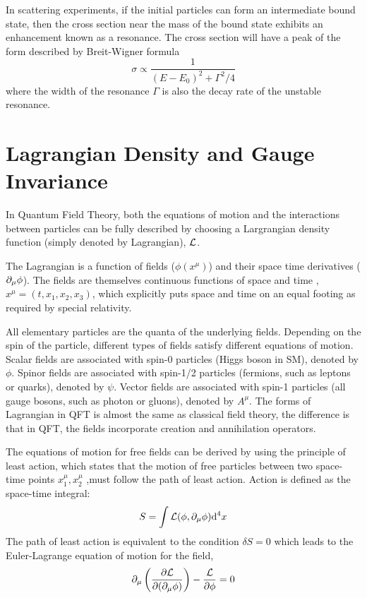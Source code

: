 In scattering experiments, if the initial particles can form an intermediate bound state, then the cross section near the mass of the bound state exhibits an enhancement known as a resonance.  The cross section will have a peak of the form described by Breit-Wigner formula
 \begin{equation}
 \sigma \propto \frac{1}{(E-E_0)^2+\Gamma^2/4}
 \end{equation} 
where the width of the resonance $\Gamma$ is also the decay rate of the unstable resonance.
 
 \section{Lagrangian Density and Gauge Invariance}
 In Quantum Field Theory, both the equations of motion and the interactions between particles can be fully described by choosing a Largrangian density function (simply denoted by Lagrangian), $\mathcal{L}$. 
 
The Lagrangian is a function of fields ($\phi(x^{\mu})$) and their space time derivatives ($\partial_\mu\phi$). The fields are themselves continuous functions of space and time , $x^{\mu} = (t,x_1,x_2,x_3)$, which explicitly puts space and time on an equal footing as required by special relativity. 
 
 All elementary particles are the quanta of the underlying fields. Depending on the spin of the particle, different types of fields satisfy different equations of motion. Scalar fields are associated with spin-0 particles (Higgs boson in SM), denoted by $\phi$. Spinor fields are associated with spin-1/2 particles (fermions, such as leptons or quarks), denoted by $\psi$. Vector fields are associated with spin-1 particles (all gauge bosons, such as photon or gluons), denoted by $A^\mu$. The forms of Lagrangian in QFT is almost the same as classical field theory, the difference is that in QFT, the fields incorporate creation and annihilation operators.
 
The equations of motion for free fields can be derived by using the principle of least action, which states that the motion of free particles between two space-time points $x_1^{\mu},x_2^{\mu}$ ,must follow the path of least action. Action is defined as the space-time integral:
 \begin{equation}
 S=\int\mathcal{L}(\phi,\partial_\mu\phi)\mathrm{d}^4x
 \end{equation} 
 The path of least action is equivalent to the condition $\delta S=0$ which leads to the Euler-Lagrange equation of motion for the field,
 \begin{equation}
 \partial_\mu\left(\frac{\partial\mathcal{L}}{\partial(\partial_\mu\phi)}\right)-\frac{\mathcal{L}}{\partial\phi}=0
 \end{equation}
 
